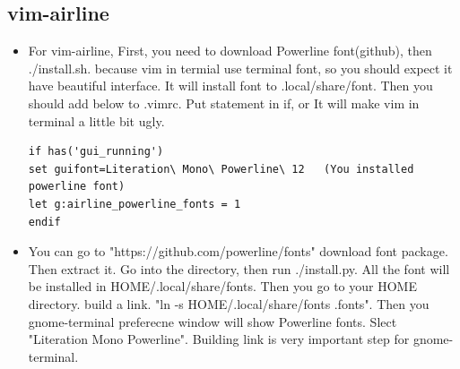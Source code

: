 \documentclass[a4paper,12pt,twoside]{book}
\begin{document}
\subsection{vim-airline} 
\begin{itemize}
\item For vim-airline,  First, you need to download Powerline font(github), then ./install.sh. because vim in termial use terminal font, so you should expect it have beautiful interface. It will install font to .local/share/font. Then you should add below to .vimrc.  Put statement in if, or It will make vim in terminal a little bit ugly. 
\begin{verbatim}
if has('gui_running')
set guifont=Literation\ Mono\ Powerline\ 12   (You installed powerline font)
let g:airline_powerline_fonts = 1
endif
\end{verbatim}
\item You can go to "https://github.com/powerline/fonts" download font package. Then extract it. Go into the directory, then run ./install.py.  All the font will be installed in HOME/.local/share/fonts. Then you go to your HOME directory. build a link. "ln -s HOME/.local/share/fonts .fonts". Then you gnome-terminal preferecne window will show Powerline fonts. Slect "Literation Mono Powerline". Building link is very important step for gnome-terminal. 
\end{itemize}
\end{document}
